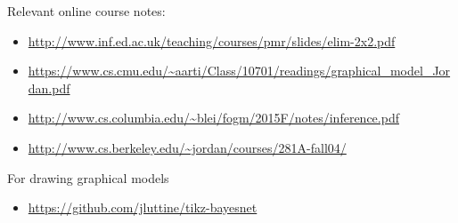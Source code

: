 \documentclass[12pt]{report}
\begin{document}
Relevant online course notes:
\begin{itemize}
\item \url{http://www.inf.ed.ac.uk/teaching/courses/pmr/slides/elim-2x2.pdf}
\item \url{https://www.cs.cmu.edu/~aarti/Class/10701/readings/graphical_model\_Jordan.pdf}
\item \url{http://www.cs.columbia.edu/~blei/fogm/2015F/notes/inference.pdf}
\item \url{http://www.cs.berkeley.edu/~jordan/courses/281A-fall04/}
\end{itemize}
For drawing graphical models
\begin{itemize}
\item \url{https://github.com/jluttine/tikz-bayesnet}
\end{itemize}
\end{document}
